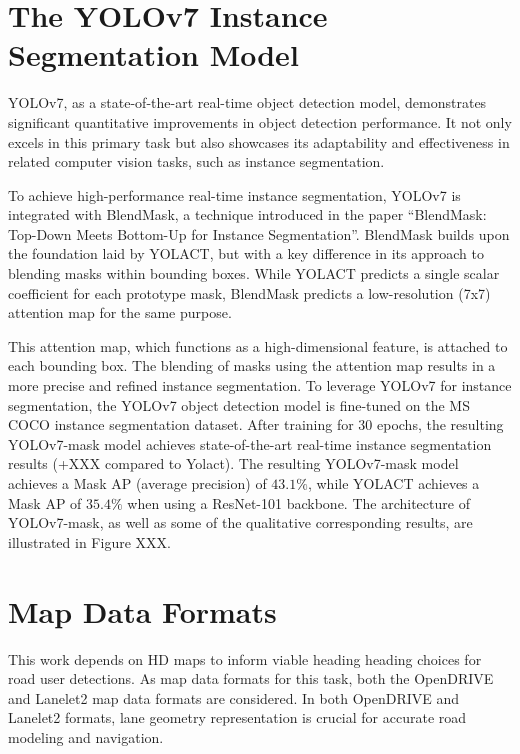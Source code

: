 \section{The YOLOv7 Instance Segmentation Model}
\label{sec:yolovseven}

YOLOv7, as a state-of-the-art real-time object detection model, demonstrates significant quantitative improvements in object detection performance.
It not only excels in this primary task but also showcases its adaptability and effectiveness in related computer vision tasks, such as instance segmentation.

To achieve high-performance real-time instance segmentation, YOLOv7 is integrated with BlendMask, a technique introduced in the paper \enquote{BlendMask: Top-Down Meets Bottom-Up for Instance Segmentation}.
BlendMask builds upon the foundation laid by YOLACT, but with a key difference in its approach to blending masks within bounding boxes.
While YOLACT predicts a single scalar coefficient for each prototype mask, BlendMask predicts a low-resolution (7x7) attention map for the same purpose.

This attention map, which functions as a high-dimensional feature, is attached to each bounding box.
The blending of masks using the attention map results in a more precise and refined instance segmentation.
To leverage YOLOv7 for instance segmentation, the YOLOv7 object detection model is fine-tuned on the MS COCO instance segmentation dataset.
After training for 30 epochs, the resulting YOLOv7-mask model achieves state-of-the-art real-time instance segmentation results (+XXX compared to Yolact).
The resulting YOLOv7-mask model achieves a Mask AP (average precision) of $43.1\%$, while YOLACT achieves a Mask AP of $35.4\%$ when using a ResNet-101 backbone.
The architecture of YOLOv7-mask, as well as some of the qualitative corresponding results, are illustrated in Figure XXX.


\section{Map Data Formats}
\label{sec:opendrive}

This work depends on HD maps to inform viable heading heading choices for road user detections.
As map data formats for this task, both the OpenDRIVE and Lanelet2 map data formats are considered.
In both OpenDRIVE and Lanelet2 formats, lane geometry representation is crucial for accurate road modeling and navigation.

